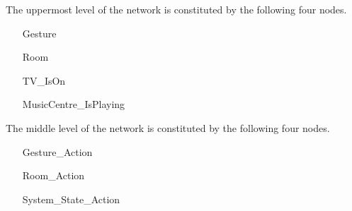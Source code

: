 The uppermost level of the network is constituted by the following four nodes.

\begin{itemize}
\item[Gesture] 
\item[Room] 
\item[TV\_IsOn] 
\item[MusicCentre\_IsPlaying] 
\end{itemize}

The middle level of the network is constituted by the following four nodes.

\begin{itemize}
\item[Gesture\_Action] 
\item[Room\_Action] 
\item[System\_State\_Action] 
\end{itemize}

